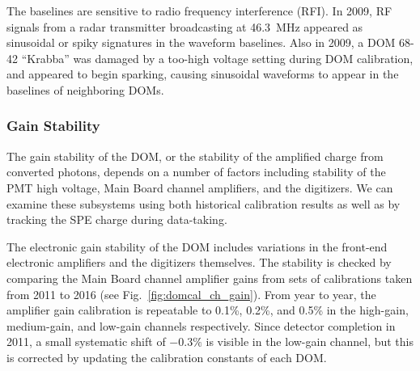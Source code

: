 The baselines are sensitive to radio frequency interference (RFI). In
2009, RF signals from a radar transmitter broadcasting at 46.3~MHz
appeared as sinusoidal or spiky signatures in the waveform
baselines. Also in 2009, a DOM 68-42 ``Krabba'' was damaged by a too-high
voltage setting during DOM calibration, and appeared to begin
sparking, causing sinusoidal waveforms to appear in the baselines of
neighboring DOMs.

\subsubsection{Gain Stability}

The gain stability of the DOM, or the stability of the amplified charge
from converted photons, depends on a number of factors including stability
of the PMT high voltage, Main Board channel amplifiers, and the digitizers.
We can examine these subsystems using both historical calibration results
as well as by tracking the SPE charge during data-taking.

The electronic gain stability of the DOM includes variations in the
front-end electronic amplifiers and the digitizers themselves.  The
stability is checked by comparing the Main Board channel amplifier gains
from sets of calibrations taken from 2011 to 2016 (see
Fig.~\ref{fig:domcal_ch_gain}).  From year to year, the amplifier gain
calibration is repeatable to 0.1\%, 0.2\%, and 0.5\% in the high-gain,
medium-gain, and low-gain channels respectively.  Since detector completion
in 2011, a small systematic shift of $-0.3\%$ is visible in the low-gain
channel, but this is corrected by updating the calibration constants of
each DOM.

